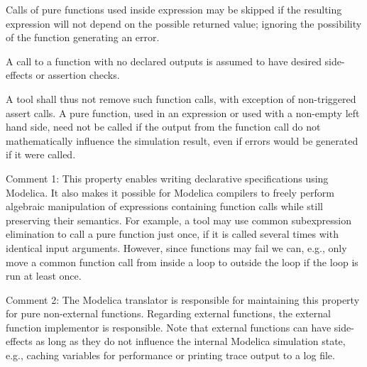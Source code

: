 Calls of pure functions used inside expression may be skipped if the resulting expression will not depend on the possible returned value; ignoring the possibility of the function generating an error.

A call to a function with no declared outputs is assumed to have desired side-effects or assertion checks.

\begin{nonnormative}
A tool shall thus not remove such function calls, with exception of non-triggered assert calls.
A pure function, used in an expression or used with a non-empty left hand side, need not be called if the output from the function call do not mathematically influence the simulation result, even if errors would be generated if it were called.
\end{nonnormative}

\begin{nonnormative}
Comment 1: This property enables writing declarative specifications using Modelica.
It also makes it possible for Modelica compilers to freely perform algebraic manipulation of expressions containing function calls while still preserving their semantics.
For example, a tool may use common subexpression elimination to call a pure function just once, if it is called several times with identical input arguments.
However, since functions may fail we can, e.g., only move a common function call from inside a loop to outside the loop if the loop is run at least once.
\end{nonnormative}

\begin{nonnormative}
Comment 2: The Modelica translator is responsible for maintaining this property for pure non-external functions.
Regarding external functions, the external function implementor is responsible.
Note that external functions can have side-effects as long as they do not influence the internal Modelica simulation state, e.g., caching variables for performance or printing trace output to a log file.
\end{nonnormative}


